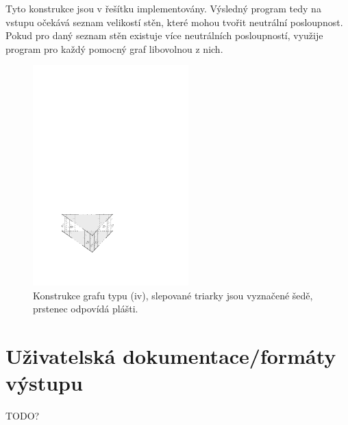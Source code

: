 Tyto konstrukce jsou v řešítku implementovány. Výsledný program tedy na vstupu očekává seznam velikostí stěn, které mohou tvořit neutrální posloupnost. Pokud pro daný seznam stěn existuje více neutrálních posloupností, využije program pro každý pomocný graf libovolnou z nich.

\begin{figure}[h]\centering
\includegraphics[width = 60mm]{../img/iv-construction}
\caption{Konstrukce grafu typu (iv), slepované triarky jsou vyznačené šedě, prstenec odpovídá plášti.}
\label{obr03:konstrukceiv}
\end{figure}



\section{Uživatelská dokumentace/formáty výstupu}

TODO?
